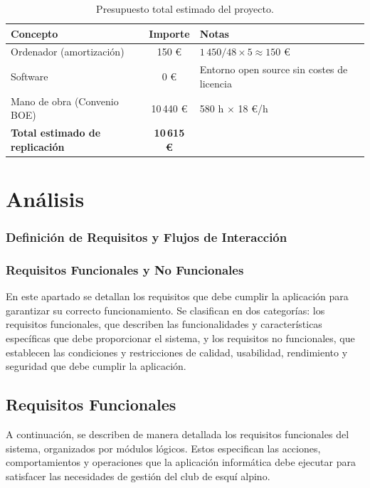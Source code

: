    \begin{table}[htbp]
    \centering
    \scriptsize
    \renewcommand{\arraystretch}{1.1}
    \begin{tabularx}{\textwidth}{|l|c|X|}
    \hline
    \rowcolor[HTML]{EFEFEF} 
    \textbf{Concepto} & \textbf{Importe} & \textbf{Notas} \\ \hline
    Ordenador (amortización) & 150 € & $1\,450 / 48 \times 5 \approx 150$ € \\ \hline
    Software & 0 € & Entorno open source sin costes de licencia \\ \hline
    Mano de obra (Convenio BOE) & 10\,440 € & 580 h $\times$ 18 €/h \\ \hline
    \textbf{Total estimado de replicación} & \textbf{10\,615 €} & \\ \hline
    \end{tabularx}
    \caption{Presupuesto total estimado del proyecto.}
    \label{tab:presupuesto_total}
    \end{table}

    \section{Análisis}
    \subsubsection{Definición de Requisitos y Flujos de Interacción}
        \subsubsection{Requisitos Funcionales y No Funcionales}
        En este apartado se detallan los requisitos que debe cumplir la aplicación para garantizar
        su correcto funcionamiento. Se clasifican en dos categorías: los requisitos funcionales, que
        describen las funcionalidades y características específicas que debe proporcionar el sistema,
        y los requisitos no funcionales, que establecen las condiciones y restricciones de calidad,
        usabilidad, rendimiento y seguridad que debe cumplir la aplicación.

        \subsection{Requisitos Funcionales}

        A continuación, se describen de manera detallada los requisitos funcionales del sistema, organizados por módulos lógicos. Estos especifican las acciones, comportamientos y operaciones que la aplicación informática debe ejecutar para satisfacer las necesidades de gestión del club de esquí alpino.

